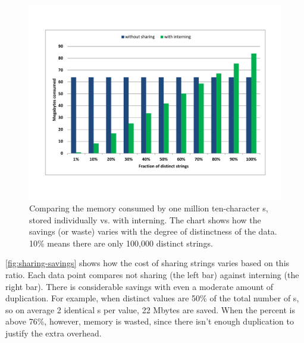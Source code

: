\begin{figure}
\centering
\includegraphics[width=\textwidth]{part1/Figures/modelingdatatypes/sharingpool_consumptionchart.pdf}
	\caption{Comparing the memory consumed by
	one million ten-character s, stored individually vs. with
	interning.
	The chart shows how the savings (or waste) varies with the degree of
	distinctness of the data. 10\%
	means there are only 100,000 distinct strings.}
	\label{fig:sharing-savings}
\end{figure}

\autoref{fig:sharing-savings} shows how the cost of sharing strings
varies based on this ratio. Each data point compares not sharing
(the left bar) against
interning (the right bar). There is considerable savings with even
a moderate amount of duplication. For example, when distinct values
are 50\% of the total number of s, so on average 2 identical s per value, 22
Mbytes are saved. When the
percent is above 76\%, however, memory is wasted, since there isn't enough duplication to justify the extra overhead.


